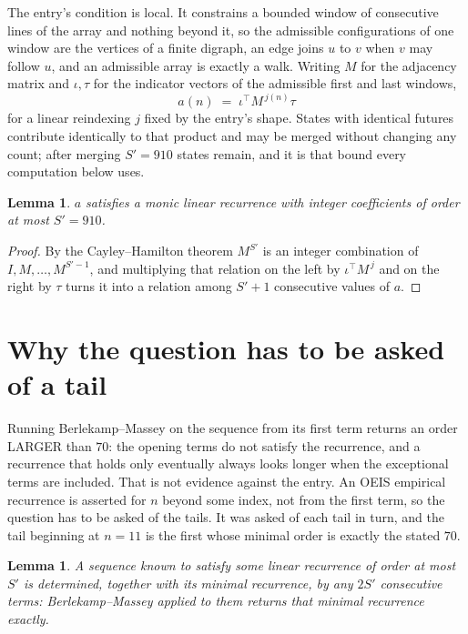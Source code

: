 \documentclass[11pt,a4paper]{article}
\theoremstyle{plain}
\newtheorem{lemma}[theorem]{Lemma}
\theoremstyle{definition}
\begin{document}
The entry's condition is local. It constrains a bounded window of consecutive lines of the
array and nothing beyond it, so the admissible configurations of one window are the vertices of
a finite digraph, an edge joins $u$ to $v$ when $v$ may follow $u$, and an admissible array is
exactly a walk. Writing $M$ for the adjacency matrix and $\iota,\tau$ for the indicator vectors
of the admissible first and last windows,
\[
a(n)\;=\;\iota^{\!\top}M^{\,j(n)}\tau
\]
for a linear reindexing $j$ fixed by the entry's shape. States with identical futures
contribute identically to that product and may be merged without changing any count; after
merging $S'=910$ states remain, and it is that bound every computation below uses.

\begin{lemma}\label{lem:cf}
$a$ satisfies a monic linear recurrence with integer coefficients of order at most $S'=910$.
\end{lemma}

\begin{proof}
By the Cayley--Hamilton theorem $M^{S'}$ is an integer combination of $I,M,\dots,M^{S'-1}$,
and multiplying that relation on the left by $\iota^{\!\top}M^{\,j}$ and on the right by
$\tau$ turns it into a relation among $S'+1$ consecutive values of $a$.
\end{proof}

\section{Why the question has to be asked of a tail}

Running Berlekamp--Massey on the sequence from its first term returns an order LARGER than $70$: the opening terms do not satisfy the recurrence, and a recurrence that holds only eventually always looks longer when the exceptional terms are included. That is not evidence against the entry. An OEIS empirical recurrence is asserted for $n$ beyond some index, not from the first term, so the question has to be asked of the tails. It was asked of each tail in turn, and the tail beginning at $n=11$ is the first whose minimal order is exactly the stated $70$.

\begin{lemma}\label{lem:bm}
A sequence known to satisfy some linear recurrence of order at most $S'$ is determined,
together with its minimal recurrence, by any $2S'$ consecutive terms: Berlekamp--Massey applied
to them returns that minimal recurrence exactly.
\end{lemma}
\end{document}
